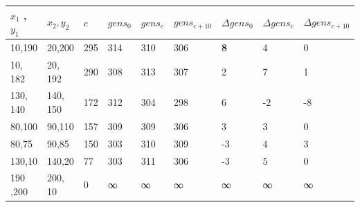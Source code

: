 \documentclass[11pt, a4paper, titlepage]{article}
\begin{document}
    \begin{table}[H]
      \begin{tabular}{|l|l|l|l|l|l|l|l|l|}
      \hline
      $x_1$ , $y_1$                                             & $x_2, y_2$ & $c$ & $gens_0$ & $gens_{c}$ & $gens_{c+10}$ & $\Delta gens_0$ & $\Delta gens_c$ & $\Delta gens_{c+10}$ \\ \hline
      10,190                                               & 20,200       & 295      & 314      & 310       & 306           & \textbf{8}             & 4                 & 0                    \\ \hline
      10,   182  & 20, 192      & 290      & 308      & 313       & 307           & 2             & 7                 & 1                    \\ \hline
      130,   140 & 140, 150     & 172      & 312      & 304       & 298           & 6             & -2                & -8                   \\ \hline
      80,100                                               & 90,110       & 157      & 309      & 309       & 306           & 3             & 3                 & 0                    \\ \hline
      80,75                                                & 90,85        & 150      & 303      & 310       & 309           & -3            & 4                 & 3                    \\ \hline
      130,10                                               & 140,20       & 77       & 303      & 311       & 306           & -3            & 5                 & 0                    \\ \hline
      190   ,200 & 200, 10      & 0        & ∞        & ∞         & ∞             & ∞             & ∞                 & ∞                    \\ \hline
      \end{tabular}
      \end{table}




      
\end{document}
